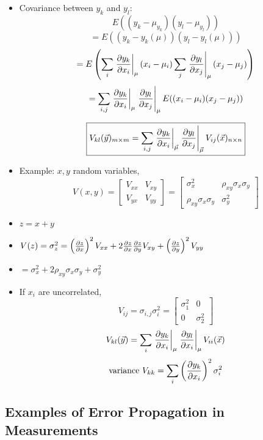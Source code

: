\begin{itemize}
    \item Covariance between $y_k$ and $y_l$:
          \[ E((y_k - \mu_{y_k})(y_l - \mu_{y_l})) \]
          \[ = E((y_k-y_k(\mu))(y_l - y_l(\mu))) \]
          \[ = E\left( \sum_i \left. \pdv{y_k}{x_i}\right|_{\mu} (x_i - \mu_i) \sum_j \left. \pdv{y_l}{x_j}\right|_{\mu} (x_j - \mu_j) \right) \]
          \[ = \sum_{i,j} \left. \pdv{y_k}{x_i}\right|_{\mu}  \left. \pdv{y_l}{x_j} \right|_{\mu} E((x_i - \mu_i)(x_j - \mu_j)) \]

          \[ \boxed{ V_{kl}(\vec{y})_{m \times m} = \sum_{i,j} \left. \pdv{y_k}{x_i}\right|_{\vec{\mu}}  \left. \pdv{y_l}{x_j} \right|_{\vec{\mu}} V_{ij}(\vec{x})_{n \times n} }\]

    \item Example: $x, y$ random variables,
          \[ V(x,y) = \begin{bmatrix}
                  V_{xx} & V_{xy} \\[6pt]
                  V_{yx} & V_{yy}
              \end{bmatrix} = \begin{bmatrix}
                  \sigma_x^2                  & \rho_{xy} \sigma_x \sigma_y \\[6pt]
                  \rho_{xy} \sigma_x \sigma_y & \sigma_y^2
              \end{bmatrix} \]
    \item $z = x + y$
    \item $V(z) = \sigma_z^2 = \left(\pdv{z}{x} \right)^2 V_{xx} + 2  \pdv{z}{x} \pdv{z}{y} V_{xy} + \left(\pdv{z}{y} \right)^2 V_{yy}$
    \item $ = \sigma_x^2 + 2 \rho_{xy} \sigma_x \sigma_y + \sigma_y^2$
    \item If $x_i$ are uncorrelated,
          \[ V_{ij} = \sigma_{i,j} \sigma_{i}^2 = \begin{bmatrix}
                  \sigma_1^2 & 0          \\[6pt]
                  0          & \sigma_2^2
              \end{bmatrix} \]
          \[ V_{kl}(\vec{y}) = \sum_i \left. \pdv{y_k}{x_i}\right|_{\mu}  \left. \pdv{y_l}{x_i} \right|_{\mu} V_{ii}(\vec{x}) \]
          \[ \text{variance } V_{kk} = \sum_i \left(\pdv{y_k}{x_i} \right)^2 \sigma_i^2 \]
\end{itemize}

\subsection{Examples of Error Propagation in Measurements}

